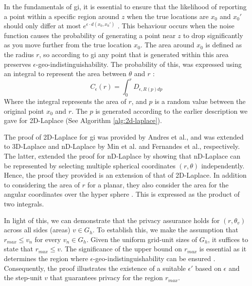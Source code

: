 In the fundamentals of \gls{gi}, it is essential to ensure that the likelihood of reporting a point within a specific region around $z$ when the true locations are $x_0$ and $x_0'$ should only differ at most $e^{\epsilon \cdot d(x_0, x_0')}$ \citep{DBLP:journals/corr/abs-1212-1984}. This behaviour occurs when the noise function causes the probability of generating a point near $z$ to drop significantly as you move further from the true location $x_0$.
The area around $x_0$ is defined as the radius $r$, so according to \gls{gi} any point that is generated within this area preserves $\epsilon$-geo-indistinguishability. The probability of this, was expressed using an integral to represent the area between $\theta$ and $r$ \citep{DBLP:journals/corr/abs-1212-1984}:
\begin{equation}
    C_\epsilon(r) = \int^r_0 D_{\epsilon, R(p)dp}
\end{equation}
Where the integral represents the area of $r$, and $p$ is a random value between the original point $x_0$ and $r$. The $p$ is generated according to the earlier description we gave for 2D-Laplace (See Algorithm \ref{alg:2d-laplace}).

The proof of 2D-Laplace for \gls{gi} was provided by Andres et al., and was extended to 3D-Laplace and nD-Laplace by Min et al. and Fernandes et al., respectively. 
The latter, extended the proof for nD-Laplace by showing that nD-Laplace can be represented by selecting multiple spherical coordinates $(r, \theta)$ independently. Hence, the proof they provided is an extension of that of 2D-Laplace. In addition to considering the area of $r$ for a planar, they also consider the area for the angular coordinates over the hyper sphere \citep{fernandes_generalised_2019}. This is expressed as the product of two integrals.\newline

In light of this, we can demonstrate that the privacy assurance holds for $(r, \theta_v)$ across all sides (areas) $v \in G_h$. 
To establish this, we make the assumption that $r_{max} \leq v_n$ for every $v_n \in G_h$. 
Given the uniform grid-unit sizes of $G_h$, it suffices to state that $r_{max} \leq v$. 
The significance of the upper bound on $r_{max}$ is essential as it determines the region where $\epsilon$-geo-indistinguishability can be ensured \citep{DBLP:journals/corr/abs-1212-1984}. Consequently, the proof illustrates the existence of a suitable $\epsilon'$ based on $\epsilon$ and the step-unit $v$ that guarantees privacy for the region $r_{max}$.

